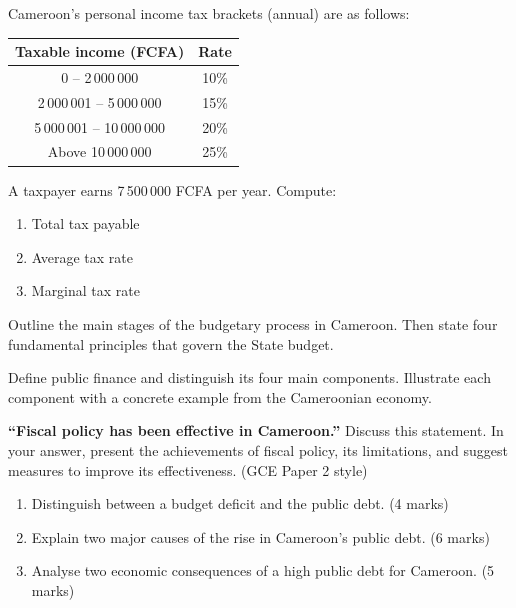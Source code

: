 \documentclass[11pt]{article}
\newcounter{popsec}
\newcounter{popsub}
\newcommand{\courssub}[1]{%
  \stepcounter{popsub}%
  \par\vspace{9pt}\noindent{\popxbold\fontsize{11.5}{13}\selectfont\color{popink}{\color{poporange}\thepopsec.\thepopsub}\hspace{6pt}#1}\par\nopagebreak\vspace{4pt}
}
\begin{document}
\begin{exercice}
Cameroon’s personal income tax brackets (annual) are as follows:
\begin{center}
\begin{tabular}{|c|c|}
\hline
\textbf{Taxable income (FCFA)} & \textbf{Rate} \\ \hline
0 – 2\,000\,000 & 10\% \\ \hline
2\,000\,001 – 5\,000\,000 & 15\% \\ \hline
5\,000\,001 – 10\,000\,000 & 20\% \\ \hline
Above 10\,000\,000 & 25\% \\ \hline
\end{tabular}
\end{center}
A taxpayer earns 7\,500\,000 FCFA per year. Compute:
\begin{enumerate}
\item Total tax payable
\item Average tax rate
\item Marginal tax rate
\end{enumerate}
\end{exercice}

\begin{exercice}
Outline the main stages of the budgetary process in Cameroon. Then state four fundamental principles that govern the State budget.
\end{exercice}

\courssub{I prepare for the GCE}

\begin{exercice}
Define public finance and distinguish its four main components. Illustrate each component with a concrete example from the Cameroonian economy.
\end{exercice}

\begin{exercice}
\textbf{``Fiscal policy has been effective in Cameroon.''} Discuss this statement. In your answer, present the achievements of fiscal policy, its limitations, and suggest measures to improve its effectiveness. (GCE Paper 2 style)
\end{exercice}

\begin{exercice}
\begin{enumerate}
\item Distinguish between a budget deficit and the public debt. (4 marks)
\item Explain two major causes of the rise in Cameroon’s public debt. (6 marks)
\item Analyse two economic consequences of a high public debt for Cameroon. (5 marks)
\end{enumerate}
\end{exercice}
\end{document}
